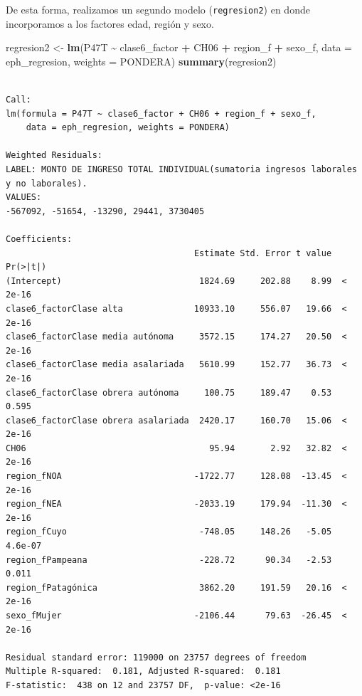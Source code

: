 \documentclass[
]{article}
\newenvironment{Shaded}{\begin{snugshade}}{\end{snugshade}}
\newcommand{\AttributeTok}[1]{\textcolor[rgb]{0.13,0.29,0.53}{#1}}
\newcommand{\FunctionTok}[1]{\textcolor[rgb]{0.13,0.29,0.53}{\textbf{#1}}}
\newcommand{\NormalTok}[1]{#1}
\newcommand{\OtherTok}[1]{\textcolor[rgb]{0.56,0.35,0.01}{#1}}
\newcommand{\SpecialCharTok}[1]{\textcolor[rgb]{0.81,0.36,0.00}{\textbf{#1}}}
\begin{document}
De esta forma, realizamos un segundo modelo (\texttt{regresion2}) en donde incorporamos a los factores edad, región y sexo.

\begin{Shaded}
\begin{Highlighting}[]
\NormalTok{regresion2 }\OtherTok{\textless{}{-}} \FunctionTok{lm}\NormalTok{(P47T }\SpecialCharTok{\textasciitilde{}}\NormalTok{ clase6\_factor }\SpecialCharTok{+}\NormalTok{ CH06 }\SpecialCharTok{+}\NormalTok{ region\_f }\SpecialCharTok{+}\NormalTok{ sexo\_f, }\AttributeTok{data =}\NormalTok{ eph\_regresion,}
    \AttributeTok{weights =}\NormalTok{ PONDERA)}
\FunctionTok{summary}\NormalTok{(regresion2)}
\end{Highlighting}
\end{Shaded}

\begin{verbatim}

Call:
lm(formula = P47T ~ clase6_factor + CH06 + region_f + sexo_f, 
    data = eph_regresion, weights = PONDERA)

Weighted Residuals:
LABEL: MONTO DE INGRESO TOTAL INDIVIDUAL(sumatoria ingresos laborales y no laborales). 
VALUES:
-567092, -51654, -13290, 29441, 3730405

Coefficients:
                                     Estimate Std. Error t value Pr(>|t|)
(Intercept)                           1824.69     202.88    8.99  < 2e-16
clase6_factorClase alta              10933.10     556.07   19.66  < 2e-16
clase6_factorClase media autónoma     3572.15     174.27   20.50  < 2e-16
clase6_factorClase media asalariada   5610.99     152.77   36.73  < 2e-16
clase6_factorClase obrera autónoma     100.75     189.47    0.53    0.595
clase6_factorClase obrera asalariada  2420.17     160.70   15.06  < 2e-16
CH06                                    95.94       2.92   32.82  < 2e-16
region_fNOA                          -1722.77     128.08  -13.45  < 2e-16
region_fNEA                          -2033.19     179.94  -11.30  < 2e-16
region_fCuyo                          -748.05     148.26   -5.05  4.6e-07
region_fPampeana                      -228.72      90.34   -2.53    0.011
region_fPatagónica                    3862.20     191.59   20.16  < 2e-16
sexo_fMujer                          -2106.44      79.63  -26.45  < 2e-16

Residual standard error: 119000 on 23757 degrees of freedom
Multiple R-squared:  0.181, Adjusted R-squared:  0.181 
F-statistic:  438 on 12 and 23757 DF,  p-value: <2e-16
\end{verbatim}
\end{document}
